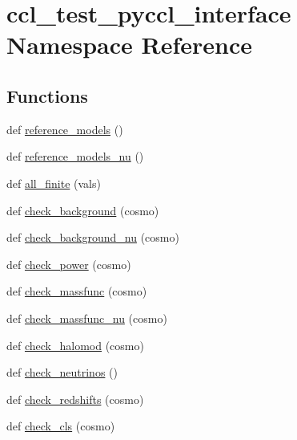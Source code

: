 \hypertarget{namespaceccl__test__pyccl__interface}{}\section{ccl\+\_\+test\+\_\+pyccl\+\_\+interface Namespace Reference}
\label{namespaceccl__test__pyccl__interface}
\subsection*{Functions}
\begin{DoxyCompactItemize}
\item 
def \mbox{\hyperlink{namespaceccl__test__pyccl__interface_af12cc81b73f2b986dbddf49f0b57759a}{reference\+\_\+models}} ()
\item 
def \mbox{\hyperlink{namespaceccl__test__pyccl__interface_a2d1bcf258dbc29d3e39ce74e3dff711e}{reference\+\_\+models\+\_\+nu}} ()
\item 
def \mbox{\hyperlink{namespaceccl__test__pyccl__interface_aecd07d8c3c95bccf7dad21e068684ad0}{all\+\_\+finite}} (vals)
\item 
def \mbox{\hyperlink{namespaceccl__test__pyccl__interface_abeb0e16edb05cf5ed17fd43254ea2d4b}{check\+\_\+background}} (cosmo)
\item 
def \mbox{\hyperlink{namespaceccl__test__pyccl__interface_afd5e77929d503c6eaed00a8a0975c13a}{check\+\_\+background\+\_\+nu}} (cosmo)
\item 
def \mbox{\hyperlink{namespaceccl__test__pyccl__interface_a0e14d8cd4b51c38207fa38e5ca127e38}{check\+\_\+power}} (cosmo)
\item 
def \mbox{\hyperlink{namespaceccl__test__pyccl__interface_af18b1262baf153cf44e7cd4fe4ebf02f}{check\+\_\+massfunc}} (cosmo)
\item 
def \mbox{\hyperlink{namespaceccl__test__pyccl__interface_ade98af8ec8a8309c2012c63e9a3766ae}{check\+\_\+massfunc\+\_\+nu}} (cosmo)
\item 
def \mbox{\hyperlink{namespaceccl__test__pyccl__interface_a54fc00031b869f3aa6aa6f383d0aeec8}{check\+\_\+halomod}} (cosmo)
\item 
def \mbox{\hyperlink{namespaceccl__test__pyccl__interface_a45d1e6f91fd168f5b48149bfdfa6aa8b}{check\+\_\+neutrinos}} ()
\item 
def \mbox{\hyperlink{namespaceccl__test__pyccl__interface_a7efa14ceb1b3cffe4925d197911c0ba8}{check\+\_\+redshifts}} (cosmo)
\item 
def \mbox{\hyperlink{namespaceccl__test__pyccl__interface_a52b035753596952f1d3d265ad903dcb3}{check\+\_\+cls}} (cosmo)

\end{DoxyCompactItemize}
